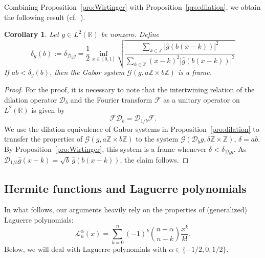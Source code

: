 \documentclass[11pt]{amsart}
\numberwithin{equation}{section}
\newtheorem{corollary}[theorem]{Corollary}
\newcommand{\R}{{\mathbb R}}
\newcommand{\Z}{{\mathbb Z}}
\newcommand{\G}{\mathcal{G}}
\begin{document}
Combining Proposition~\ref{pro:Wirtinger} with Proposition~\ref{pro:dilation}, we obtain the following result (cf.~\cite{Fau26}).
\begin{corollary}\label{cor:Wirtinger_rectangular}
    Let $g \in L^2(\R)$ be nonzero. Define
    \begin{equation}\label{eq:Wirtinger_rectangular}
        \delta_g(b) := \delta_{\mathcal{D}_b g}
        = \frac{1}{2} \inf_{x \in [0,1]}
        \sqrt{\frac{\displaystyle\sum_{k\in\mathbb Z}|\widehat g(b(x-k))|^2}{\displaystyle\sum_{k\in\mathbb Z}(x-k)^2|\widehat g(b(x-k))|^2}}
    \end{equation}
    If $a b < \delta_g(b)$, then the Gabor system $\G(g, a \Z \times b \Z)$ is a frame.
\end{corollary}
\begin{proof}
    For the proof, it is necessary to note that the intertwining relation of the dilation operator $\mathcal{D}_b$ and the Fourier transform $\mathcal{F}$ as a unitary operator on $L^2(\R)$ is given by
    \begin{equation}
        \mathcal{F} \mathcal{D}_b = \mathcal{D}_{1/b} \mathcal{F}.
    \end{equation}
    We use the dilation equivalence of Gabor systems in Proposition~\ref{pro:dilation} to transfer the properties of $\G(g, a \Z \times b \Z)$ to the system $\G(\mathcal{D}_b g, \delta\Z \times \Z)$, $\delta=a b$. By Proposition~\ref{pro:Wirtinger}, this system is a frame whenever $\delta < \delta_{\mathcal{D}_b g}$. As $\mathcal{D}_{1/b} \widehat{g}(x-k) = \sqrt{b} \, \widehat{g}(b(x-k))$, the claim follows.
\end{proof}

\subsection{Hermite functions and Laguerre polynomials}
In what follows, our arguments heavily rely on the properties of (generalized) Laguerre polynomials:
\begin{equation}
    \mathcal{L}^{\alpha}_n(x) = \sum_{k=0}^n (-1)^k \binom{n + \alpha}{n - k} \frac{x^k}{k!}.
\end{equation}
Below, we will deal with Laguerre polynomials with $\alpha\in \{ -1/{2},0,1/{2}\}.$
\end{document}
